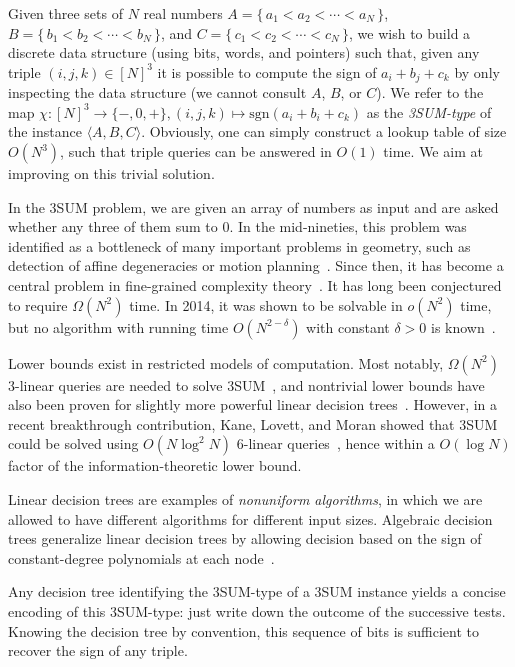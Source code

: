 Given three sets of \(N\) real numbers
\(A = \{\, a_1 < a_2 < \cdots < a_N\,\} \),
\(B = \{\, b_1 < b_2 < \cdots < b_N\,\} \),
and \(C = \{\, c_1 < c_2 < \cdots < c_N\,\}\),
we wish to build a discrete data structure (using bits, words, and pointers) such that,
given any triple \((i,j,k) \in {[N]}^3\) it is possible to compute the sign of
\(a_i + b_j + c_k\) by only inspecting the data structure (we cannot consult
\(A\), \(B\), or \(C\)).
We refer to the map $\chi : {[N]}^3\to \{-,0,+\}, (i,j,k)\mapsto\mathrm{sgn}
(a_i+b_i+c_k)$ as the {\em 3SUM-type} of the instance $\langle A,B,C \rangle$.
Obviously, one can simply construct a lookup table of size \(O(N^3)\), such
that triple queries can be answered in \(O(1)\) time. We aim at improving on
this trivial solution.

In the 3SUM problem, we are given an array of numbers as input and are asked
whether any three of them sum to 0. In the mid-nineties, this problem was
identified as a bottleneck of many
important problems in geometry, such as detection of affine degeneracies or
motion planning~\cite{GO95}. Since then, it has become a central problem in
fine-grained complexity theory~\cite{PW10}. It has long been conjectured to
require $\Omega (N^2)$ time. In 2014, it was shown to be solvable in $o(N^2)$
time, but no algorithm with running time $O(N^{2-\delta})$ with constant
$\delta>0$ is known~\cite{GP18}.

Lower bounds exist in restricted models of computation. Most notably,
$\Omega(N^2)$ 3-linear queries are needed to solve 3SUM~\cite{Er99a},
and nontrivial lower bounds have also been proven for slightly more powerful linear
decision trees~\cite{AC05}. However, in a recent breakthrough contribution, Kane, Lovett,
and Moran showed that 3SUM could be solved using $O(N\log^2 N)$
6-linear queries~\cite{KLM18}, hence within a $O(\log N)$ factor of the
information-theoretic lower bound.

Linear decision trees are examples of {\em nonuniform algorithms}, in which we
are allowed to have different algorithms for different input sizes.
Algebraic decision trees generalize linear decision trees
by allowing decision based on the sign of constant-degree polynomials at each
node~\cite{SY82}.

Any decision tree identifying the 3SUM-type of a 3SUM instance yields a concise
encoding of this 3SUM-type:
just write down the outcome of the successive tests. Knowing the decision tree
by convention, this sequence of bits is
sufficient to recover the sign of any triple.

